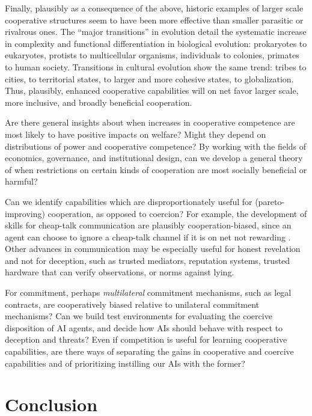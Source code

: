 \documentclass[11pt, a4paper, logo, onecolumn, nonumbering]{deepmind}
\begin{document}
Finally, plausibly as a consequence of the above, historic examples of larger scale cooperative structures seem to have been more effective than smaller parasitic or rivalrous ones. The ``major transitions'' in evolution detail the systematic increase in complexity and functional differentiation in biological evolution: prokaryotes to eukaryotes, protists to multicellular organisms, individuals to colonies, primates to human society. Transitions in cultural evolution show the same trend: tribes to cities, to territorial states, to larger and more cohesive states, to globalization. %
Thus, plausibly, enhanced cooperative capabilities will on net favor larger scale, more inclusive, and broadly beneficial cooperation. 

Are there general insights about when increases in cooperative competence are most likely to have positive impacts on welfare? Might they depend on distributions of power and cooperative competence? By working with the fields of economics, governance, and institutional design, can we develop a general theory of when restrictions on certain kinds of cooperation are most socially beneficial or harmful? 

Can we identify capabilities which are disproportionately useful for (pareto-improving) cooperation, as opposed to coercion? For example, the development of skills for cheap-talk communication are plausibly cooperation-biased, since an agent can  choose to ignore a cheap-talk channel if it is on net not rewarding \cite{jaques2019social}.
Other advances in communication may be especially useful for honest revelation and not for deception, such as trusted mediators, reputation systems, trusted hardware that can verify observations, or norms against lying. 

For commitment, perhaps \textit{multilateral} commitment mechanisms, such as legal contracts, are cooperatively biased relative to unilateral commitment mechanisms?
Can we build test environments for evaluating the coercive disposition of AI agents, and decide how AIs should behave with respect to deception and threats? 
Even if competition is useful for learning cooperative capabilities, are there ways of separating the gains in cooperative and coercive capabilities and of prioritizing instilling our AIs with the former? 


\section{Conclusion}
\label{section:conclusion}
\end{document}
